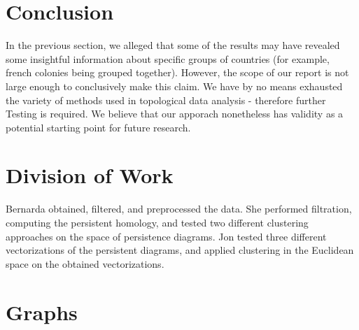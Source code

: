 \documentclass[12pt]{article}
\begin{document}
\section{Conclusion}
In the previous section, we alleged that some of the results may have revealed some insightful information about specific groups of countries (for example, french colonies being grouped together). However, the scope of our report is not large enough to conclusively make this claim. We have by no means exhausted the variety of methods used in topological data analysis - therefore further Testing is required. 
We believe that our apporach nonetheless has validity as a potential starting point for future research.

\section{Division of Work}
Bernarda obtained, filtered, and preprocessed the data. She performed filtration, computing the persistent homology, and tested two different clustering approaches on the space of persistence diagrams.
Jon tested three different vectorizations of the persistent diagrams, and applied clustering in the Euclidean space on the obtained vectorizations. 


\section*{Graphs}
\end{document}
